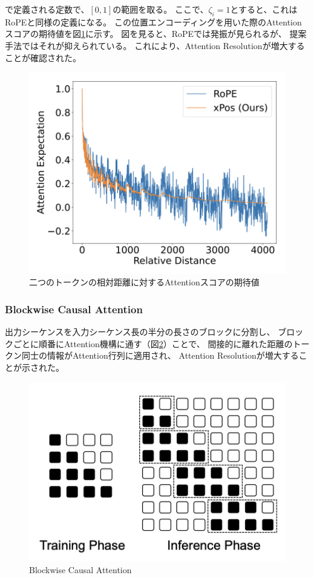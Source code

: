 \documentclass{jsarticle}
\begin{document}
        で定義される定数で、$[0,1]$の範囲を取る。
        ここで、$\zeta_i=1$とすると、これはRoPEと同様の定義になる。
        この位置エンコーディングを用いた際のAttentionスコアの期待値を図\ref{fig:exp}に示す。
        図を見ると、RoPEでは発振が見られるが、
        提案手法ではそれが抑えられている。
        これにより、Attention Resolutionが増大することが確認された。
        \begin{figure}[ht]
            \centering
            \includegraphics[width=.6\hsize]{exp.png}
            \caption{二つのトークンの相対距離に対するAttentionスコアの期待値\cite{extra}}
            \label{fig:exp}
        \end{figure}

    \subsubsection{Blockwise Causal Attention}
        出力シーケンスを入力シーケンス長の半分の長さのブロックに分割し、
        ブロックごとに順番にAttention機構に通す（図\ref{fig:block}）ことで、
        間接的に離れた距離のトークン同士の情報がAttention行列に適用され、
        Attention Resolutionが増大することが示された。
        \begin{figure}[ht]
            \centering
            \includegraphics[width=.6\hsize]{block.png}
            \caption{
                Blockwise Causal Attention\cite{extra}
            }
            \label{fig:block}
        \end{figure}
\end{document}
